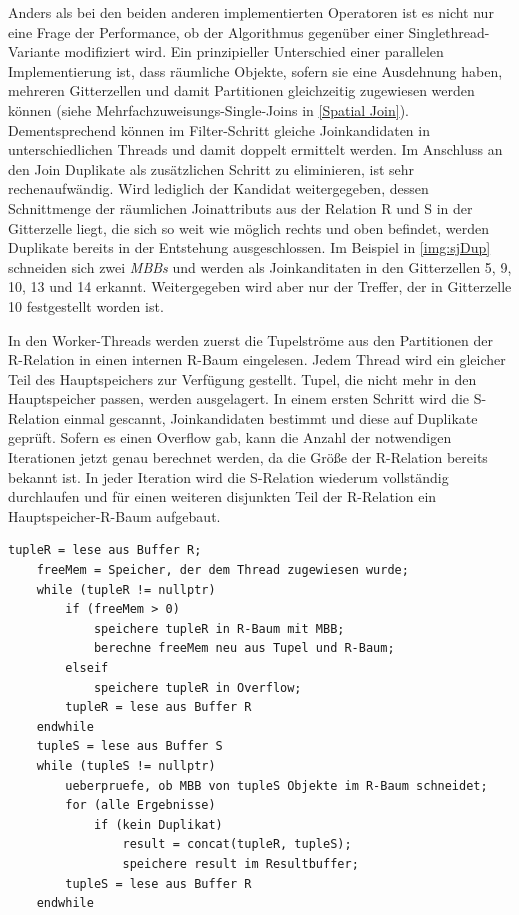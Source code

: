 \documentclass[a4paper,12pt,twoside]{article}
\newcommand{\Fb}[1]{\textit{#1}} %
\begin{document}
Anders als bei den beiden anderen implementierten Operatoren ist es nicht nur eine Frage der Performance, ob der Algorithmus gegenüber einer Singlethread-Variante modifiziert wird. Ein prinzipieller Unterschied einer parallelen Implementierung ist, dass räumliche Objekte, sofern sie eine Ausdehnung haben, mehreren Gitterzellen und damit Partitionen gleichzeitig zugewiesen werden können (siehe Mehrfachzuweisungs-Single-Joins in \autoref{Spatial Join}). Dementsprechend können im Filter-Schritt gleiche Joinkandidaten in unterschiedlichen Threads und damit doppelt ermittelt werden. Im Anschluss an den Join Duplikate als zusätzlichen Schritt zu eliminieren, ist sehr rechenaufwändig. Wird lediglich der Kandidat weitergegeben, dessen Schnittmenge der räumlichen Joinattributs aus der Relation R und S in der Gitterzelle liegt, die sich so weit wie möglich rechts und oben befindet, werden Duplikate bereits in der Entstehung ausgeschlossen. Im Beispiel in \autoref{img:sjDup} schneiden sich zwei \Fb{MBBs} und werden als Joinkanditaten in den Gitterzellen 5, 9, 10, 13 und 14 erkannt. Weitergegeben wird aber nur der Treffer, der in Gitterzelle 10 festgestellt worden ist.

In den Worker-Threads werden zuerst die Tupelströme aus den Partitionen der R-Relation in einen internen R-Baum eingelesen. Jedem Thread wird ein gleicher Teil des Hauptspeichers zur Verfügung gestellt. Tupel, die nicht mehr in den Hauptspeicher passen, werden ausgelagert. In einem ersten Schritt wird die S-Relation einmal gescannt, Joinkandidaten bestimmt und diese auf Duplikate geprüft. Sofern es einen Overflow gab, kann die Anzahl der notwendigen Iterationen jetzt genau berechnet werden, da die Größe der R-Relation bereits bekannt ist. In jeder Iteration wird die S-Relation wiederum vollständig durchlaufen und für einen weiteren disjunkten Teil der R-Relation ein Hauptspeicher-R-Baum aufgebaut.

\begin{minipage}{0.95\textwidth}
	\begin{lstlisting}[caption={Spatial-Join: Worker.}, label=list:spatialJoin]
	tupleR = lese aus Buffer R;
	freeMem = Speicher, der dem Thread zugewiesen wurde; 
	while (tupleR != nullptr)
		if (freeMem > 0)
			speichere tupleR in R-Baum mit MBB;
			berechne freeMem neu aus Tupel und R-Baum;
		elseif
			speichere tupleR in Overflow;
		tupleR = lese aus Buffer R 
	endwhile
	tupleS = lese aus Buffer S
	while (tupleS != nullptr)
		ueberpruefe, ob MBB von tupleS Objekte im R-Baum schneidet;
		for (alle Ergebnisse)
			if (kein Duplikat)
				result = concat(tupleR, tupleS);
				speichere result im Resultbuffer;
		tupleS = lese aus Buffer R
	endwhile
	\end{lstlisting}
\end{minipage}
\end{document}
